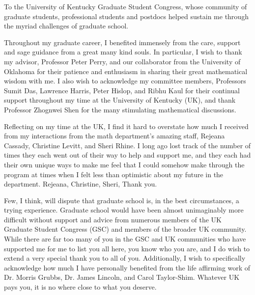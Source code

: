 \documentclass[final, leqno]{ukthesis}
\numberwithin{equation}{chapter}
\begin{document}
\frontmatter
\maketitle
\begin{dedication}
	To the University of Kentucky Graduate Student Congress, whose community of graduate students, 
	professional students and postdocs helped sustain me through the myriad challenges of 
	graduate school.
\end{dedication}
\begin{acknowledgments}
	Throughout my graduate career, I benefited immensely from the care, support and 
	sage guidance from a great many kind souls. In particular, I wish to thank my advisor, 
	Professor Peter Perry, and our collaborator from the University of Oklahoma for
	their patience and enthusiasm in sharing their great mathematical wisdom with me.
	I also wish to acknowledge my committee members, Professors Sumit Das, Lawrence 
	Harris, Peter Hislop, and Ribhu Kaul for their continual support throughout my 
	time at the University of Kentucky (UK), and thank Professor Zhognwei Shen 
	for the many stimulating mathematical discussions.

	Reflecting on my time at the UK, I find it hard to overstate 
	how much I received from my interactions from the math department's amazing 
	staff, Rejeana Cassady, Christine Levitt, and Sheri Rhine. I long ago lost 
	track of the number of times they each went out of their way to help and 
	support me, and they each had their own unique ways to make me feel that 
	I could somehow make through the program at times when I felt less
	than optimistic about my future in the department. Rejeana, Christine, Sheri,
	Thank you.

	Few, I think, will dispute that graduate school is, in the best circumstances,
	a trying experience. Graduate school would have been almost unimaginably 
	more difficult without support and advice from numerous members
	of the UK Graduate Student Congress (GSC) and members of the 
	broader UK community. While there are far too many of you in the GSC and 
	UK communities who have supported me for me to list you all here, you know who 
	you are, and I do wish to extend a very special thank you to all of you. 
	Additionally, I wish to specifically acknowledge how much I have personally 
	benefited from the life affirming work of Dr. Morris Grubbs, Dr. James Lincoln, 
	and Carol Taylor-Shim. Whatever UK pays you, it is no where close to what you 
	deserve.


\end{acknowledgments}
\end{document}
